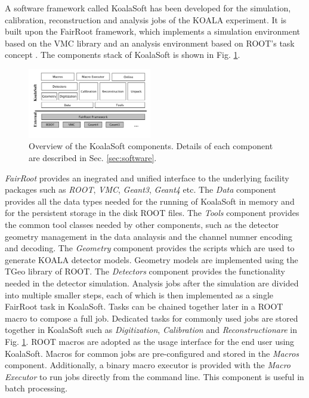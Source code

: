 \documentclass[number,5p]{elsarticle}
\begin{document}
A software framework called KoalaSoft has been developed for the simulation, calibration, reconstruction and analysis jobs of the KOALA experiment.
It is built upon the FairRoot \cite{fairroot} framework, which implements a
simulation environment based on the VMC \cite{vmc} library and an analysis
environment based on ROOT's task concept \cite{root}.
The components stack of KoalaSoft is shown in Fig. \ref{fig:koalasoft}.

\begin{figure}[htbp]
  \centering
  \includegraphics[width=0.48\textwidth]{./koalasoft_components.png}
  \caption{Overview of the KoalaSoft components. Details of each component are
    described in Sec. \ref{sec:software}.}
  \label{fig:koalasoft}
\end{figure}

\textit{FairRoot} provides an inegrated and unified interface to the underlying facility
packages such as \textit{ROOT}, \textit{VMC}, \textit{Geant3}, \textit{Geant4} etc.
The \textit{Data} component provides all the data types needed for the running
of KoalaSoft in memory and for the persistent storage in the disk ROOT files.
The \textit{Tools} component provides the common tool classes needed by other
components, such as the detector geometry management in the data analaysis and
the channel numner encoding and decoding.
The \textit{Geometry} component provides the scripts which are used to generate KOALA detector models.
Geometry models are implemented using the TGeo library of ROOT.
The \textit{Detectors} component provides the functionality needed in the
detector simulation.
Analysis jobs after the simulation are divided into multiple smaller steps, each of which is
then implemented as a single FairRoot task in KoalaSoft.
Tasks can be chained together later in a ROOT macro to compose a full job. 
Dedicated tasks for commonly used jobs are stored together in KoalaSoft such as
\textit{Digitization}, \textit{Calibration} and \textit{Reconstructionare} in
Fig. \ref{fig:koalasoft}.
ROOT macros are adopted as the usage interface for the end user using KoalaSoft.
Macros for common jobs are pre-configured and stored in the \textit{Macros} component.
Additionally, a binary macro executor is provided with the \textit{Macro
  Executor} to run jobs directly from the command line. This component is useful in batch processing.
\end{document}
